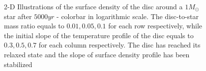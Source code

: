 \documentclass[aps,prb,twocolumn,superscriptaddress,floatfix,longbibliography]{revtex4-2}
\begin{document}
\begin{appendices}
\begin{figure}[!htbp]
  \caption{2-D Illustrations of the surface density of the disc around a $1 M_{\odot}$ star after $5000yr$ - colorbar in logarithmic scale. The disc-to-star mass ratio equals to $0.01, 0.05, 0.1$ for each row respectively, while the initial slope of the temperature profile of the disc equals to $0.3, 0.5, 0.7$ for each column respectively. The disc has reached its relaxed state and the slope of surface density profile has been stabilized}
\end{figure}
\end{appendices}
\newpage
\twocolumngrid
\clearpage
{}


\end{document}
